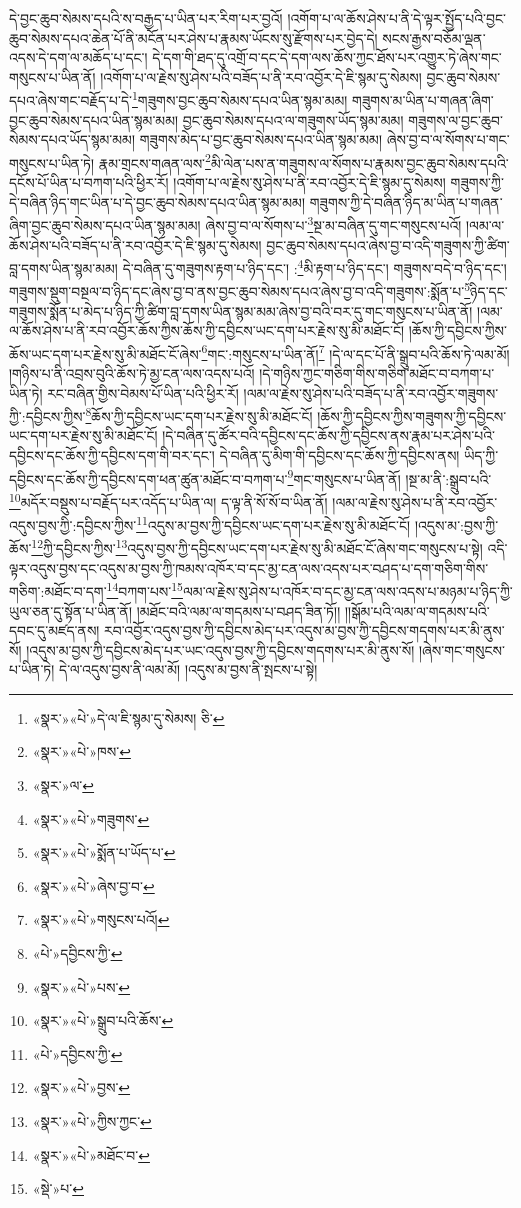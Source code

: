 དེ་བྱང་ཆུབ་སེམས་དཔའི་ས་བརྒྱད་པ་ཡིན་པར་རིག་པར་བྱའོ། །འགོག་པ་ལ་ཆོས་ཤེས་པ་ནི་དེ་ལྟར་སྤྱོད་པའི་བྱང་ཆུབ་སེམས་དཔའ་ཆེན་པོ་ནི་མངོན་པར་ཤེས་པ་རྣམས་ཡོངས་སུ་རྫོགས་པར་བྱེད་དེ། སངས་རྒྱས་བཅོམ་ལྡན་འདས་དེ་དག་ལ་མཆོད་པ་དང་། དེ་དག་གི་ཐད་དུ་འགྲོ་བ་དང་དེ་དག་ལས་ཆོས་ཀྱང་ཐོས་པར་འགྱུར་ཏེ་ཞེས་གང་གསུངས་པ་ཡིན་ནོ། །འགོག་པ་ལ་རྗེས་སུ་ཤེས་པའི་བཟོད་པ་ནི་རབ་འབྱོར་དེ་ཇི་སྙམ་དུ་སེམས། བྱང་ཆུབ་སེམས་དཔའ་ཞེས་གང་བརྗོད་པ་དེ་\footnote{«སྣར་»«པེ་»དེ་ལ་ཇི་སྙམ་དུ་སེམས། ཅི་}གཟུགས་བྱང་ཆུབ་སེམས་དཔའ་ཡིན་སྙམ་མམ། གཟུགས་མ་ཡིན་པ་གཞན་ཞིག་བྱང་ཆུབ་སེམས་དཔའ་ཡིན་སྙམ་མམ། བྱང་ཆུབ་སེམས་དཔའ་ལ་གཟུགས་ཡོད་སྙམ་མམ། གཟུགས་ལ་བྱང་ཆུབ་སེམས་དཔའ་ཡོད་སྙམ་མམ། གཟུགས་མེད་པ་བྱང་ཆུབ་སེམས་དཔའ་ཡིན་སྙམ་མམ། ཞེས་བྱ་བ་ལ་སོགས་པ་གང་གསུངས་པ་ཡིན་ཏེ། རྣམ་གྲངས་གཞན་ལས་\footnote{«སྣར་»«པེ་»ཁས་}མི་ལེན་པས་ན་གཟུགས་ལ་སོགས་པ་རྣམས་བྱང་ཆུབ་སེམས་དཔའི་དངོས་པོ་ཡིན་པ་བཀག་པའི་ཕྱིར་རོ། །འགོག་པ་ལ་རྗེས་སུ་ཤེས་པ་ནི་རབ་འབྱོར་དེ་ཇི་སྙམ་དུ་སེམས། གཟུགས་ཀྱི་དེ་བཞིན་ཉིད་གང་ཡིན་པ་དེ་བྱང་ཆུབ་སེམས་དཔའ་ཡིན་སྙམ་མམ། གཟུགས་ཀྱི་དེ་བཞིན་ཉིད་མ་ཡིན་པ་གཞན་ཞིག་བྱང་ཆུབ་སེམས་དཔའ་ཡིན་སྙམ་མམ། ཞེས་བྱ་བ་ལ་སོགས་པ་\footnote{«སྣར་»ལ་}སྔ་མ་བཞིན་དུ་གང་གསུངས་པའོ། །ལམ་ལ་ཆོས་ཤེས་པའི་བཟོད་པ་ནི་རབ་འབྱོར་དེ་ཇི་སྙམ་དུ་སེམས། བྱང་ཆུབ་སེམས་དཔའ་ཞེས་བྱ་བ་འདི་གཟུགས་ཀྱི་ཚིག་བླ་དགས་ཡིན་སྙམ་མམ། དེ་བཞིན་དུ་གཟུགས་རྟག་པ་ཉིད་དང་། :\footnote{«སྣར་»«པེ་»གཟུགས་}མི་རྟག་པ་ཉིད་དང་། གཟུགས་བདེ་བ་ཉིད་དང་། གཟུགས་སྡུག་བསྔལ་བ་ཉིད་དང་ཞེས་བྱ་བ་ནས་བྱང་ཆུབ་སེམས་དཔའ་ཞེས་བྱ་བ་འདི་གཟུགས་:སྨོན་པ་\footnote{«སྣར་»«པེ་»སྨོན་པ་ཡོད་པ་}ཉིད་དང་གཟུགས་སྨོན་པ་མེད་པ་ཉིད་ཀྱི་ཚིག་བླ་དགས་ཡིན་སྙམ་མམ་ཞེས་བྱ་བའི་བར་དུ་གང་གསུངས་པ་ཡིན་ནོ། །ལམ་ལ་ཆོས་ཤེས་པ་ནི་རབ་འབྱོར་ཆོས་ཀྱིས་ཆོས་ཀྱི་དབྱིངས་ཡང་དག་པར་རྗེས་སུ་མི་མཐོང་ངོ། །ཆོས་ཀྱི་དབྱིངས་ཀྱིས་ཆོས་ཡང་དག་པར་རྗེས་སུ་མི་མཐོང་ངོ་ཞེས་\footnote{«སྣར་»«པེ་»ཞེས་བྱ་བ་}གང་:གསུངས་པ་ཡིན་ནོ།\footnote{«སྣར་»«པེ་»གསུངས་པའོ།} །དེ་ལ་དང་པོ་ནི་སྒྲུབ་པའི་ཆོས་ཏེ་ལམ་མོ། །གཉིས་པ་ནི་འབྲས་བུའི་ཆོས་ཏེ་མྱ་ངན་ལས་འདས་པའོ། །དེ་གཉིས་ཀྱང་གཅིག་གིས་གཅིག་མཐོང་བ་བཀག་པ་ཡིན་ཏེ། རང་བཞིན་གྱིས་བེམས་པོ་ཡིན་པའི་ཕྱིར་རོ། །ལམ་ལ་རྗེས་སུ་ཤེས་པའི་བཟོད་པ་ནི་རབ་འབྱོར་གཟུགས་ཀྱི་:དབྱིངས་ཀྱིས་\footnote{«པེ་»དབྱིངས་ཀྱི་}ཆོས་ཀྱི་དབྱིངས་ཡང་དག་པར་རྗེས་སུ་མི་མཐོང་ངོ། །ཆོས་ཀྱི་དབྱིངས་ཀྱིས་གཟུགས་ཀྱི་དབྱིངས་ཡང་དག་པར་རྗེས་སུ་མི་མཐོང་ངོ། །དེ་བཞིན་དུ་ཚོར་བའི་དབྱིངས་དང་ཆོས་ཀྱི་དབྱིངས་ནས་རྣམ་པར་ཤེས་པའི་དབྱིངས་དང་ཆོས་ཀྱི་དབྱིངས་དག་གི་བར་དང་། དེ་བཞིན་དུ་མིག་གི་དབྱིངས་དང་ཆོས་ཀྱི་དབྱིངས་ནས། ཡིད་ཀྱི་དབྱིངས་དང་ཆོས་ཀྱི་དབྱིངས་དག་ཕན་ཚུན་མཐོང་བ་བཀག་པ་\footnote{«སྣར་»«པེ་»པས་}གང་གསུངས་པ་ཡིན་ནོ། །སྔ་མ་ནི་:སྒྲུབ་པའི་\footnote{«སྣར་»«པེ་»སྒྲུབ་པའི་ཆོས་}མདོར་བསྡུས་པ་བརྗོད་པར་འདོད་པ་ཡིན་ལ། ད་ལྟ་ནི་སོ་སོ་བ་ཡིན་ནོ། །ལམ་ལ་རྗེས་སུ་ཤེས་པ་ནི་རབ་འབྱོར་འདུས་བྱས་ཀྱི་:དབྱིངས་ཀྱིས་\footnote{«པེ་»དབྱིངས་ཀྱི་}འདུས་མ་བྱས་ཀྱི་དབྱིངས་ཡང་དག་པར་རྗེས་སུ་མི་མཐོང་ངོ། །འདུས་མ་:བྱས་ཀྱི་ཆོས་\footnote{«སྣར་»«པེ་»བྱས་}ཀྱི་དབྱིངས་ཀྱིས་\footnote{«སྣར་»«པེ་»ཀྱིས་ཀྱང་}འདུས་བྱས་ཀྱི་དབྱིངས་ཡང་དག་པར་རྗེས་སུ་མི་མཐོང་ངོ་ཞེས་གང་གསུངས་པ་སྟེ། འདི་ལྟར་འདུས་བྱས་དང་འདུས་མ་བྱས་ཀྱི་ཁམས་འཁོར་བ་དང་མྱ་ངན་ལས་འདས་པར་བཤད་པ་དག་གཅིག་གིས་གཅིག་:མཐོང་བ་དག་\footnote{«སྣར་»«པེ་»མཐོང་བ་}བཀག་པས་\footnote{«སྡེ་»པ་}ལམ་ལ་རྗེས་སུ་ཤེས་པ་འཁོར་བ་དང་མྱ་ངན་ལས་འདས་པ་མཉམ་པ་ཉིད་ཀྱི་ཡུལ་ཅན་དུ་སྟོན་པ་ཡིན་ནོ། །མཐོང་བའི་ལམ་ལ་གདམས་པ་བཤད་ཟིན་ཏོ།། །།སྒོམ་པའི་ལམ་ལ་གདམས་པའི་དབང་དུ་མཛད་ནས། རབ་འབྱོར་འདུས་བྱས་ཀྱི་དབྱིངས་མེད་པར་འདུས་མ་བྱས་ཀྱི་དབྱིངས་གདགས་པར་མི་ནུས་སོ། །འདུས་མ་བྱས་ཀྱི་དབྱིངས་མེད་པར་ཡང་འདུས་བྱས་ཀྱི་དབྱིངས་གདགས་པར་མི་ནུས་སོ། །ཞེས་གང་གསུངས་པ་ཡིན་ཏེ། དེ་ལ་འདུས་བྱས་ནི་ལམ་མོ། །འདུས་མ་བྱས་ནི་སྤངས་པ་སྟེ། 